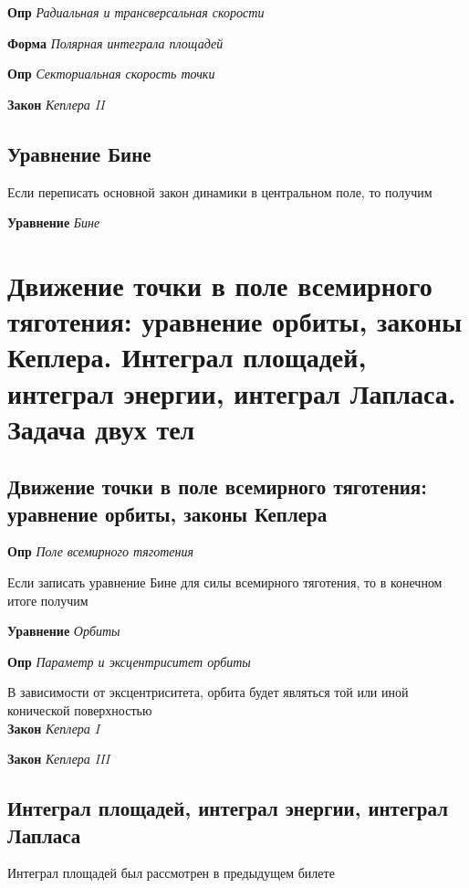\documentclass[a4paper, 14pt]{article}
\begin{document}
    \textbf{Опр} \textit{Радиальная и трансверсальная скорости}
    
    \textbf{Форма} \textit{Полярная интеграла площадей}
    
    \textbf{Опр} \textit{Секториальная скорость точки}
    
    \textbf{Закон} \textit{Кеплера II}
    
    \subsection{Уравнение Бине}
    
    Если переписать основной закон динамики в центральном поле, то получим
    
    \textbf{Уравнение} \textit{Бине}
    
    \section{Движение точки в поле всемирного тяготения: уравнение орбиты, законы Кеплера.
    Интеграл площадей, интеграл энергии, интеграл Лапласа.
    Задача двух тел}
    
    \subsection{Движение точки в поле всемирного тяготения: уравнение орбиты, законы Кеплера}
    
    \textbf{Опр} \textit{Поле всемирного тяготения}
    
    Если записать уравнение Бине для силы всемирного тяготения, то в конечном итоге получим
    
    \textbf{Уравнение} \textit{Орбиты}
    
    \textbf{Опр} \textit{Параметр и эксцентриситет орбиты}
    
    В зависимости от эксцентриситета, орбита будет являться той или иной конической поверхностью \\
    
    \textbf{Закон} \textit{Кеплера I}
    
    \textbf{Закон} \textit{Кеплера III}
    
    \subsection{Интеграл площадей, интеграл энергии, интеграл Лапласа}
    
    Интеграл площадей был рассмотрен в предыдущем билете
    
\end{document}

